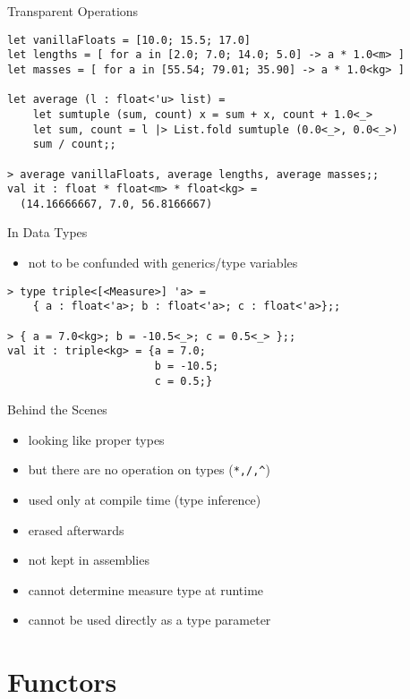 \documentclass{beamer}
\begin{document}
\begin{frame}[fragile]{Transparent Operations}
  \small
  \begin{verbatim}
let vanillaFloats = [10.0; 15.5; 17.0]
let lengths = [ for a in [2.0; 7.0; 14.0; 5.0] -> a * 1.0<m> ]
let masses = [ for a in [55.54; 79.01; 35.90] -> a * 1.0<kg> ]

let average (l : float<'u> list) =
    let sumtuple (sum, count) x = sum + x, count + 1.0<_>
    let sum, count = l |> List.fold sumtuple (0.0<_>, 0.0<_>)
    sum / count;;

> average vanillaFloats, average lengths, average masses;;
val it : float * float<m> * float<kg> =
  (14.16666667, 7.0, 56.8166667)
  \end{verbatim}
\end{frame}

\begin{frame}[fragile]{In Data Types}
  \begin{itemize}
    \item not to be confunded with generics/type variables
  \end{itemize}
  \begin{verbatim}
> type triple<[<Measure>] 'a> =
    { a : float<'a>; b : float<'a>; c : float<'a>};;

> { a = 7.0<kg>; b = -10.5<_>; c = 0.5<_> };;
val it : triple<kg> = {a = 7.0;
                       b = -10.5;
                       c = 0.5;}
  \end{verbatim}
\end{frame}

\begin{frame}{Behind the Scenes}
  \begin{itemize}[<+->]
    \item looking like proper types
    \item but there are no operation on types (\texttt{*,/,\^})
    \item used only at compile time (type inference)
    \item erased afterwards
    \item not kept in assemblies
    \item cannot determine measure type at runtime
    \item cannot be used directly as a type parameter
  \end{itemize}
\end{frame}

\section{Functors}
\frame{\tableofcontents[currentsection]}
\end{document}
